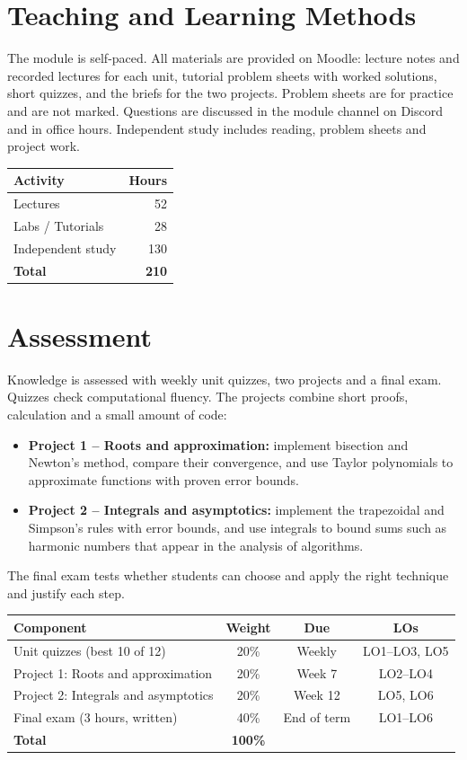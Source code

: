 \documentclass[11pt,a4paper]{article}
\begin{document}
\section{Teaching and Learning Methods}
The module is self-paced. All materials are provided on Moodle: lecture notes and
recorded lectures for each unit, tutorial problem sheets with worked solutions,
short quizzes, and the briefs for the two projects. Problem sheets are for practice
and are not marked. Questions are discussed in the module channel on Discord and in
office hours. Independent study includes reading, problem sheets and project work.

\begin{tabularx}{0.6\textwidth}{X r}
\toprule
\textbf{Activity} & \textbf{Hours} \\
\midrule
Lectures            & 52 \\
Labs / Tutorials    & 28 \\
Independent study   & 130 \\
\midrule
\textbf{Total}      & \textbf{210} \\
\bottomrule
\end{tabularx}

\section{Assessment}
Knowledge is assessed with weekly unit quizzes, two projects and a final
exam. Quizzes check computational fluency. The projects combine short proofs,
calculation and a small amount of code:
\begin{itemize}
  \item \textbf{Project 1 -- Roots and approximation:} implement bisection and
        Newton's method, compare their convergence, and use Taylor polynomials to
        approximate functions with proven error bounds.
  \item \textbf{Project 2 -- Integrals and asymptotics:} implement the trapezoidal
        and Simpson's rules with error bounds, and use integrals to bound sums such as
        harmonic numbers that appear in the analysis of algorithms.
\end{itemize}
The final exam tests whether students can choose and apply the right technique and
justify each step.

\begin{tabularx}{\textwidth}{X c c c}
\toprule
\textbf{Component} & \textbf{Weight} & \textbf{Due} & \textbf{LOs} \\
\midrule
Unit quizzes (best 10 of 12) & 20\% & Weekly & LO1--LO3, LO5 \\
Project 1: Roots and approximation & 20\% & Week 7 & LO2--LO4 \\
Project 2: Integrals and asymptotics & 20\% & Week 12 & LO5, LO6 \\
Final exam (3 hours, written) & 40\% & End of term & LO1--LO6 \\
\midrule
\textbf{Total}      & \textbf{100\%} & & \\
\bottomrule
\end{tabularx}
\end{document}
